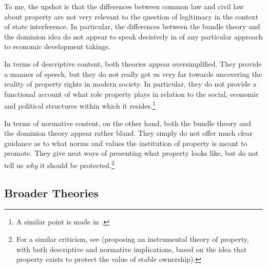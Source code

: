 To me, the upshot is that the differences between common law and civil law  about property are not very relevant to the question of legitimacy in the context of state interference. In particular, the differences between the bundle theory and the dominion idea do not appear to speak decisively in  of any particular approach to economic development takings.

In terms of descriptive content, both theories appear oversimplified. They provide a manner of speech, but they do not really get us very far towards uncovering the reality of property rights in modern society. In particular, they do not provide a functional account of what role property plays in relation to the social, economic and political structures within which it resides.\footnote{A similar point is made in \cite[2-6]{alexander12}.}

In terms of normative content, on the other hand, both the bundle theory and the dominion theory appear rather bland. They simply do not offer much clear guidance as to what norms and values the institution of property is meant to promote. They give neat ways of presenting what property looks like, but do not tell us {\it why} it should be protected.\footnote{For a similar criticism, see \cite[535-536]{bell05} (proposing an instrumental theory of property, with both descriptive and normative implications, based on the idea that property exists to protect the value of stable ownership).}

\subsection{Broader Theories}


